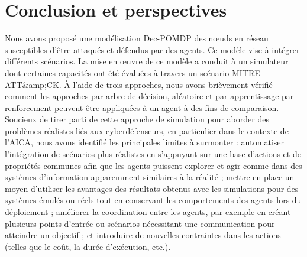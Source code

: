 \section{Conclusion et perspectives}

\noindent Nous avons proposé une modélisation Dec-POMDP des nœuds en réseau susceptibles d'être attaqués et défendus par des agents. Ce modèle vise à intégrer différents scénarios. La mise en œuvre de ce modèle a conduit à un simulateur dont certaines capacités ont été évaluées à travers un scénario MITRE ATT\&amp;CK. À l'aide de trois approches, nous avons brièvement vérifié comment les approches par arbre de décision, aléatoire et par apprentissage par renforcement peuvent être appliquées à un agent à des fins de comparaison.
Soucieux de tirer parti de cette approche de simulation pour aborder des problèmes réalistes liés aux cyberdéfenseurs, en particulier dans le contexte de l'AICA, nous avons identifié les principales limites à surmonter :
automatiser l'intégration de scénarios plus réalistes en s'appuyant sur une base d'actions et de propriétés communes afin que les agents puissent explorer et agir comme dans des systèmes d'information apparemment similaires à la réalité ;
mettre en place un moyen d'utiliser les avantages des résultats obtenus avec les simulations pour des systèmes émulés ou réels tout en conservant les comportements des agents lors du déploiement ;
améliorer la coordination entre les agents, par exemple en créant plusieurs points d'entrée ou scénarios nécessitant une communication pour atteindre un objectif ;
et introduire de nouvelles contraintes dans les actions (telles que le coût, la durée d'exécution, etc.).
